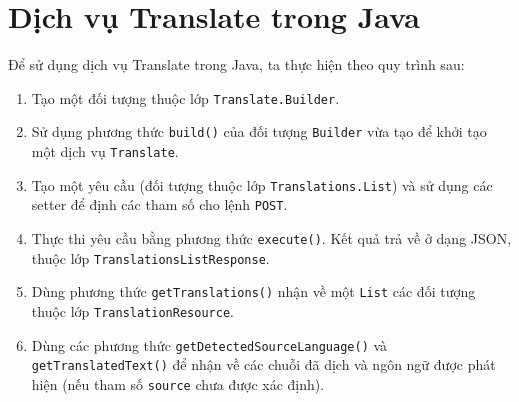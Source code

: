 \documentclass[../thesis.tex]{subfiles}
\begin{document}
\section{Dịch vụ Translate trong Java}
Để sử dụng dịch vụ Translate trong Java, ta thực hiện theo quy trình sau:
\begin{enumerate}
  \item Tạo một đối tượng thuộc lớp \lstinline{Translate.Builder}.
  \item Sử dụng phương thức \lstinline{build()} của đối tượng \lstinline{Builder} vừa tạo để khởi tạo một dịch vụ \lstinline{Translate}.
  \item Tạo một yêu cầu (đối tượng thuộc lớp \lstinline{Translations.List}) và sử dụng các setter để định các tham số cho lệnh \lstinline{POST}.
  \item Thực thi yêu cầu bằng phương thức \lstinline{execute()}. Kết quả trả về ở dạng JSON, thuộc lớp \lstinline{TranslationsListResponse}.
  \item Dùng phương thức \lstinline{getTranslations()} nhận về một \lstinline{List} các đối tượng thuộc lớp \lstinline{TranslationResource}.
  \item Dùng các phương thức \lstinline{getDetectedSourceLanguage()} và \lstinline{getTranslatedText()} để nhận về các chuỗi đã dịch và ngôn ngữ được phát hiện (nếu tham số \lstinline{source} chưa được xác định).
\end{enumerate}


\end{document}
